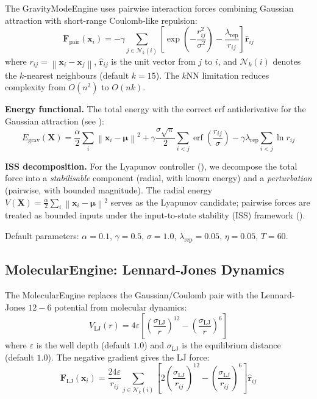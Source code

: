 \documentclass{article}
\newcommand{\norm}[1]{\left\lVert#1\right\rVert}
\DeclareMathOperator{\erf}{erf}
\begin{document}
The GravityModeEngine uses pairwise interaction forces combining Gaussian attraction with short-range Coulomb-like repulsion:
\begin{equation}
\mathbf{F}_{\text{pair}}(\mathbf{x}_i) = -\gamma \sum_{j \in \mathcal{N}_k(i)} \left[\exp\!\left(-\frac{r_{ij}^2}{\sigma^2}\right) - \frac{\lambda_{\text{rep}}}{r_{ij}}\right] \hat{\mathbf{r}}_{ij}
\label{eq:f_pair}
\end{equation}
where $r_{ij} = \norm{\mathbf{x}_i - \mathbf{x}_j}$, $\hat{\mathbf{r}}_{ij}$ is the unit vector from $j$ to $i$, and $\mathcal{N}_k(i)$ denotes the $k$-nearest neighbours (default $k{=}15$). The $k$NN limitation reduces complexity from $O(n^2)$ to $O(nk)$.

\textbf{Energy functional.} The total energy with the correct erf antiderivative for the Gaussian attraction (see ):
\begin{equation}
\boxed{
E_{\text{grav}}(\mathbf{X}) = \frac{\alpha}{2}\sum_i \norm{\mathbf{x}_i - \bm{\mu}}^2 + \gamma\frac{\sigma\sqrt{\pi}}{2}\sum_{i<j}\erf\!\left(\frac{r_{ij}}{\sigma}\right) - \gamma\lambda_{\text{rep}}\sum_{i<j}\ln r_{ij}
}
\label{eq:energy}
\end{equation}

\textbf{ISS decomposition.} For the Lyapunov controller (), we decompose the total force into a \emph{stabilisable} component (radial, with known energy) and a \emph{perturbation} (pairwise, with bounded magnitude). The radial energy $V(\mathbf{X}) = \frac{\alpha}{2}\sum_i \norm{\mathbf{x}_i - \bm{\mu}}^2$ serves as the Lyapunov candidate; pairwise forces are treated as bounded inputs under the input-to-state stability (ISS) framework ().

Default parameters: $\alpha = 0.1$, $\gamma = 0.5$, $\sigma = 1.0$, $\lambda_{\text{rep}} = 0.05$, $\eta = 0.05$, $T = 60$.

\subsection{MolecularEngine: Lennard-Jones Dynamics}
\label{ssec:molecular_engine}

The MolecularEngine replaces the Gaussian/Coulomb pair with the Lennard-Jones $12{-}6$ potential from molecular dynamics:
\begin{equation}
V_{\text{LJ}}(r) = 4\varepsilon\left[\left(\frac{\sigma_{\text{LJ}}}{r}\right)^{12} - \left(\frac{\sigma_{\text{LJ}}}{r}\right)^{6}\right]
\label{eq:lj}
\end{equation}
where $\varepsilon$ is the well depth (default $1.0$) and $\sigma_{\text{LJ}}$ is the equilibrium distance (default $1.0$). The negative gradient gives the LJ force:
\begin{equation}
\mathbf{F}_{\text{LJ}}(\mathbf{x}_i) = \frac{24\varepsilon}{r_{ij}} \sum_{j \in \mathcal{N}_k(i)} \left[2\left(\frac{\sigma_{\text{LJ}}}{r_{ij}}\right)^{12} - \left(\frac{\sigma_{\text{LJ}}}{r_{ij}}\right)^{6}\right] \hat{\mathbf{r}}_{ij}
\label{eq:f_lj}
\end{equation}
\end{document}
